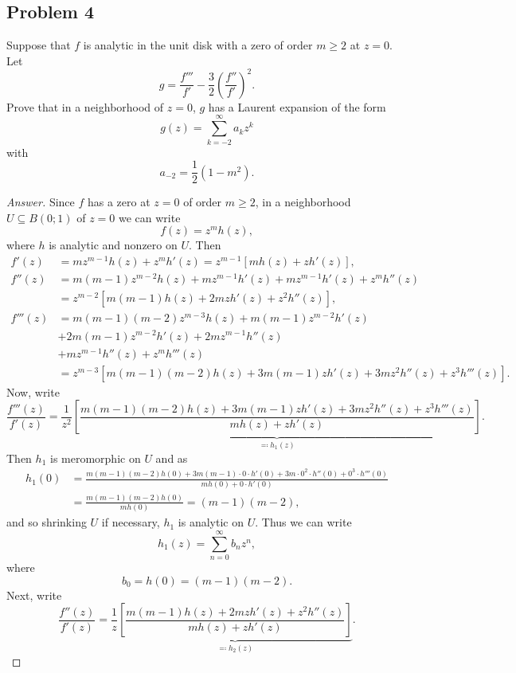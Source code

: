 \documentclass[12pt]{article}
\newcommand\paren[1]{\left( #1 \right)}
\newcommand{\sqbrack}[1]{\left [ #1 \right ]}
\theoremstyle{definition}
\begin{document}
\subsection{Problem 4}
Suppose that $f$ is analytic in the unit disk with a zero of order $m \geq 2$ at $z = 0$. Let 
\[
    g = \frac{f'''}{f'} - \frac{3}{2} \paren{ \frac{f''}{f'} }^2.
\]
Prove that in a neighborhood of $z = 0$, $g$ has a Laurent expansion of the form
\[
    g(z) = \sum\limits_{k = -2}^{\infty} a_k z^k
\]
with 
\[
    a_{-2} = \frac{1}{2} (1-m^2). 
\]
\begin{proof}[Answer]
    Since $f$ has a zero at $z = 0$ of order $m \geq 2$, in a neighborhood $U \subseteq B(0;1)$ of $z = 0$ we can write 
    \[
        f(z) = z^m h(z) , 
    \]
    where $h$ is analytic and nonzero on $U$. Then 
    \begin{align*}
        f'(z) & = m z^{m-1} h(z) + z^m h'(z) = z^{m-1} \sqbrack{ m h(z) + z h'(z) } , \\ 
        f''(z) & = m(m-1) z^{m-2} h(z) + m z^{m-1} h'(z) + m z^{m-1} h'(z) + z^m h''(z) \\ 
        & = z^{m-2} \sqbrack{ m(m-1)h(z) + 2mz h'(z) + z^2 h''(z) } , \\ 
        f'''(z) & = m(m-1)(m-2) z^{m-3} h(z) + m(m-1) z^{m-2} h'(z) \\ 
        & + 2m(m-1) z^{m-2} h'(z) + 2m z^{m-1} h''(z) \\ 
        & + m z^{m-1} h''(z) + z^m h'''(z) \\ 
        & = z^{m-3} \sqbrack{ m(m-1)(m-2) h(z) + 3m(m-1) z h'(z) + 3m z^2 h''(z) + z^3 h'''(z) } . 
    \end{align*}
    Now, write 
    \[
        \frac{f'''(z)}{f'(z)} = \frac{1}{z^2} \underbrace{ \sqbrack{ \frac{m(m-1)(m-2) h(z) + 3m(m-1) z h'(z) + 3m z^2 h''(z) + z^3 h'''(z)}{ m h(z) + z h'(z) } } }_{ \eqqcolon h_1(z) } .
    \]
    Then $h_1$ is meromorphic on $U$ and as 
    \begin{align*}
        h_1(0) & = \frac{m(m-1)(m-2) h(0) + 3m(m-1) \cdot 0 \cdot h'(0) + 3m \cdot 0^2 \cdot h''(0) + 0^3 \cdot h'''(0)}{m h(0) + 0 \cdot h'(0)} \\ 
        & = \frac{m(m-1)(m-2) h(0)}{mh(0)} = (m-1)(m-2) , 
    \end{align*}
    and so shrinking $U$ if necessary, $h_1$ is analytic on $U$. Thus we can write 
    \[
        h_1(z) = \sum\limits_{n = 0}^{\infty} b_n z^n , 
    \]
    where 
    \[
        b_0 = h(0) = (m-1)(m-2) . 
    \]
    Next, write 
    \[
        \frac{f''(z)}{f'(z)} = \frac{1}{z} \underbrace{ \sqbrack{ \frac{ m(m-1) h(z) + 2m z h'(z) + z^2 h''(z) }{ m h(z) + z h'(z) } } }_{ \eqqcolon h_2(z) } . 
\]
\end{proof}
\end{document}
